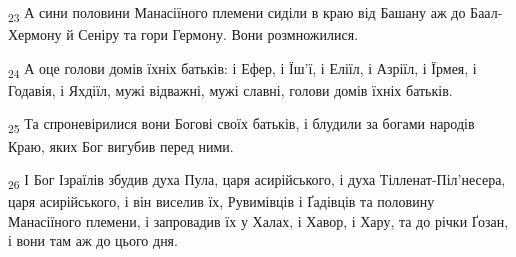 \begin{tcolorbox}
\textsubscript{23} А сини половини Манасіїного племени сиділи в краю від Башану аж до Баал-Хермону й Сеніру та гори Гермону. Вони розмножилися.
\end{tcolorbox}
\begin{tcolorbox}
\textsubscript{24} А оце голови домів їхніх батьків: і Ефер, і Їш'ї, і Еліїл, і Азріїл, і Їрмея, і Годавія, і Яхдіїл, мужі відважні, мужі славні, голови домів їхніх батьків.
\end{tcolorbox}
\begin{tcolorbox}
\textsubscript{25} Та спроневірилися вони Богові своїх батьків, і блудили за богами народів Краю, яких Бог вигубив перед ними.
\end{tcolorbox}
\begin{tcolorbox}
\textsubscript{26} І Бог Ізраїлів збудив духа Пула, царя асирійського, і духа Тілленат-Піл'несера, царя асирійського, і він виселив їх, Рувимівців і Ґадівців та половину Манасіїного племени, і запровадив їх у Халах, і Хавор, і Хару, та до річки Ґозан, і вони там аж до цього дня.
\end{tcolorbox}
